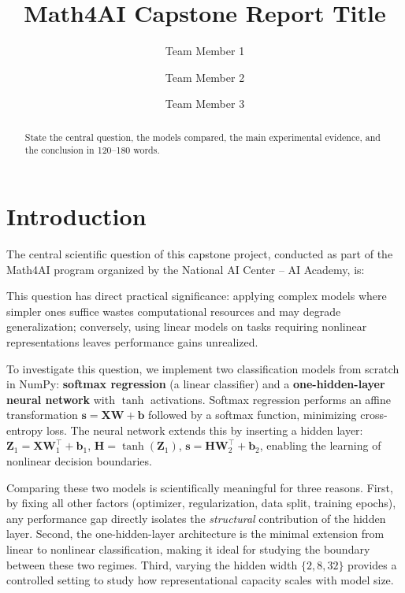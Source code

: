 \documentclass[11pt]{article}
\title{Math4AI Capstone Report Title}
\author{Team Member 1 \and Team Member 2 \and Team Member 3}
\date{}
\begin{document}
\maketitle

\begin{abstract}
State the central question, the models compared, the main experimental evidence, and the conclusion in 120--180 words.
\end{abstract}

\section{Introduction}

The central scientific question of this capstone project, conducted as part of the Math4AI program organized by the National AI Center -- AI Academy, is:

\begin{center}
\end{center}

This question has direct practical significance: applying complex models where simpler ones suffice wastes computational resources and may degrade generalization; conversely, using linear models on tasks requiring nonlinear representations leaves performance gains unrealized.

To investigate this question, we implement two classification models from scratch in NumPy: \textbf{softmax regression} (a linear classifier) and a \textbf{one-hidden-layer neural network} with $\operatorname{tanh}$ activations. Softmax regression performs an affine transformation $\mathbf{s} = \mathbf{X}\mathbf{W} + \mathbf{b}$ followed by a softmax function, minimizing cross-entropy loss. The neural network extends this by inserting a hidden layer: $\mathbf{Z}_1 = \mathbf{X}\mathbf{W}_1^\top + \mathbf{b}_1$, $\mathbf{H} = \tanh(\mathbf{Z}_1)$, $\mathbf{s} = \mathbf{H}\mathbf{W}_2^\top + \mathbf{b}_2$, enabling the learning of nonlinear decision boundaries.

Comparing these two models is scientifically meaningful for three reasons. First, by fixing all other factors (optimizer, regularization, data split, training epochs), any performance gap directly isolates the \emph{structural} contribution of the hidden layer. Second, the one-hidden-layer architecture is the minimal extension from linear to nonlinear classification, making it ideal for studying the boundary between these two regimes. Third, varying the hidden width $\{2, 8, 32\}$ provides a controlled setting to study how representational capacity scales with model size.
\end{document}
